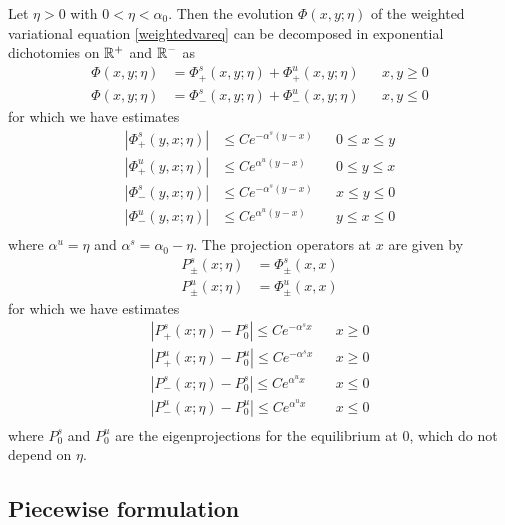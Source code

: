 \documentclass[thesis.tex]{subfiles}
\begin{document}

\begin{lemma}\label{weighteddichotomylemma}
Let $\eta > 0$ with $0 < \eta < \alpha_0$. Then the evolution $\Phi(x, y; \eta)$ of the weighted variational equation \cref{weightedvareq} can be decomposed in exponential dichotomies on $\mathbb{R}^+$ and $\mathbb{R}^-$ as
\begin{align*}
\Phi(x, y; \eta) &= \Phi^s_+(x, y; \eta) + \Phi^u_+(x, y; \eta) && x, y \geq 0 \\
\Phi(x, y; \eta) &= \Phi^s_-(x, y; \eta) + \Phi^u_-(x, y; \eta) && x, y \leq 0 
\end{align*}
for which we have estimates
\begin{align*}
|\Phi^s_+(y,x; \eta)| &\leq Ce^{-\alpha^s(y-x)} && 0 \leq x \leq y \\
|\Phi^u_+(y,x; \eta)| &\leq Ce^{\alpha^u(y-x)}  && 0 \leq y \leq x \\
|\Phi^s_-(y,x; \eta)| &\leq Ce^{-\alpha^s(y-x)} && x \leq y \leq 0 \\
|\Phi^u_-(y,x; \eta)| &\leq Ce^{\alpha^u(y-x)}  && y \leq x \leq 0 \\
\end{align*}
where $\alpha^u = \eta$ and $\alpha^s = \alpha_0 - \eta$. The projection operators at $x$ are given by
\begin{align*}
P^s_\pm(x; \eta) &= \Phi^s_\pm(x,x)\\
P^u_\pm(x; \eta) &= \Phi^u_\pm(x,x)
\end{align*}
for which we have estimates
\begin{equation}\label{weightedprojest}
\begin{aligned}
|P^s_+(x; \eta) - P_0^s| \leq Ce^{-\alpha^s x} && x \geq 0 \\
|P^u_+(x; \eta) - P_0^u| \leq Ce^{-\alpha^s x} && x \geq 0 \\
|P^s_-(x; \eta) - P_0^s| \leq Ce^{\alpha^u x} && x \leq 0 \\
|P^u_-(x; \eta) - P_0^u| \leq Ce^{\alpha^u x} && x \leq 0 \\
\end{aligned}
\end{equation}
where $P_0^s$ and $P_0^u$ are the eigenprojections for the equilibrium at 0, which do not depend on $\eta$.
\end{lemma}

\subsection{Piecewise formulation}\label{sec:kdvRpiecewise}
\end{document}
